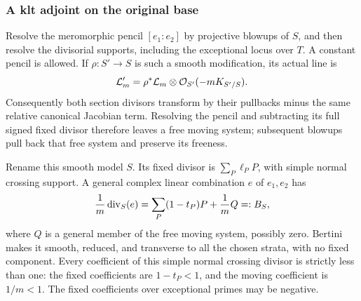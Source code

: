 \subsubsection{A klt adjoint on the original base}

Resolve the meromorphic pencil \([e_1:e_2]\) by projective blowups
of \(S\), and then resolve the divisorial supports, including the
exceptional locus over \(T\). A constant pencil is allowed. If
\(\rho:S'\to S\) is such a smooth modification, its actual line is
\begin{equation}\label{pos:base-canonical-transform}
 \mathcal L'_m
 =\rho^*\mathcal L_m\otimes\mathcal{O}_{S'}(-mK_{S'/S}).
\end{equation}
Consequently both section divisors transform by their pullbacks minus
the same relative canonical Jacobian term. Resolving the pencil and
subtracting its full signed fixed divisor therefore leaves a free
moving system; subsequent blowups pull back that free system and
preserve its freeness.

Rename this smooth model \(S\). Its fixed divisor is
\(\sum_P\ell_PP\), with simple normal crossing support. A general
complex linear combination \(e\) of \(e_1,e_2\) has
\begin{equation}\label{pos:crepant-boundary-upstairs}
 \frac1m\operatorname{div}_S(e)
 =\sum_P(1-t_P)P+\frac1mQ=:B_S,
\end{equation}
where \(Q\) is a general member of the free moving system, possibly
zero. Bertini makes it smooth, reduced, and transverse to all the
chosen strata, with no fixed component. Every coefficient of this
simple normal crossing divisor is strictly less than one: the fixed
coefficients are \(1-t_P<1\), and the moving coefficient is
\(1/m<1\). The fixed coefficients over exceptional primes may be
negative.

